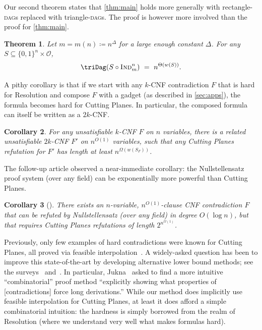 \documentclass[11pt]{article}
\numberwithin{equation}{section}
\newtheorem{theorem}{Theorem}[section]
\newtheorem{corollary}[theorem]{Corollary}
\theoremstyle{definition}
\theoremstyle{plain}
\newcommand{\Ind}{\textsc{Ind}}
\newcommand{\DAGs}{\textsc{dag}s\xspace}
\newcommand{\calO}{\mathcal{O}}
\begin{document}
\bigskip\noindent
Our second theorem states that \autoref{thm:main} holds more generally with rectangle-\DAGs replaced with triangle-\DAGs. The proof is however more involved than the proof for \autoref{thm:main}.

\begin{theorem} \label{thm:triangle}
Let $m=m(n)\coloneqq n^\Delta$ for a large enough constant $\Delta$. For any $S\subseteq\{0,1\}^n\times \calO$,
\[
\triDag(S\circ \Ind_m^n)~=~
n^{\Theta(w(S))}.
\]
\end{theorem}


A pithy corollary is that if we start with any $k$-CNF contradiction $F$ that is hard for Resolution and compose $F$ with a gadget (as described in \autoref{sec:apps}), the formula becomes hard for Cutting Planes. In particular, the composed formula can itself be written as a $2k$-CNF.

\begin{corollary}\label{cor:cutting-lb}
For any unsatisfiable $k$-CNF $F$ on $n$ variables, there is a related unsatisfiable $2k$-CNF $F'$ on $n^{O(1)}$ variables, such that any Cutting Planes refutation for $F'$ has length at least $n^{\Omega(w(S_F))}$.
\end{corollary}

The follow-up %
article \cite{goos19monotone} %
observed a near-immediate corollary: the Nullstellensatz proof system (over any field) can be exponentially more powerful than Cutting Planes.

\begin{corollary}[{\cite[\S4.2]{goos19monotone}}]\label{cor:cp-vs-ns}
There exists an $n$-variable, $n^{O(1)}$-clause CNF contradiction $F$ that can be refuted by Nullstellensatz (over any field) in degree $O(\log n)$, but that requires Cutting Planes refutations of length $2^{n^{\Omega(1)}}$.
\end{corollary}

Previously, only few examples of hard contradictions were known for Cutting Planes, all proved via feasible interpolation~\cite{pudlak97lower,haken99exponential,hrubes17randomformulas,fleming17randomcnf}. A widely-asked question has been to improve this state-of-the-art by developing alternative lower bound methods; see the surveys~\cite[\S4]{beame01propositional} and~\cite[\S5]{razborov16proof}. In particular, Jukna~\cite[Research Problem 19.17]{jukna12boolean} asked to find a more intuitive ``combinatorial'' proof method ``explicitly showing what properties of [contradictions] force long derivations.'' While our method does implicitly use feasible interpolation for Cutting Planes, at least it does afford a simple combinatorial intuition: the hardness is simply borrowed from the realm of Resolution (where we understand very well what makes formulas hard).
\end{document}
